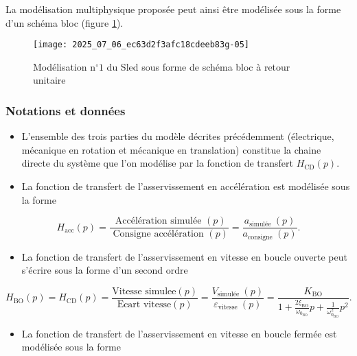 
La modélisation multiphysique proposée peut ainsi être modélisée sous la forme d'un schéma bloc (figure \ref{ccs_mp_2022_fig_07}).

\begin{figure}[!h]
\centering
\texttt{[image: 2025\_07\_06\_ec63d2f3afc18cdeeb83g-05]}
\caption{\label{ccs_mp_2022_fig_07}Modélisation $\mathrm{n}^{\circ} 1$ du Sled sous forme de schéma bloc à retour unitaire}
\end{figure}


\subsubsection*{Notations et données}
\begin{itemize}
  \item L'ensemble des trois parties du modèle décrites précédemment (électrique, mécanique en rotation et mécanique en translation) constitue la chaine directe du système que l'on modélise par la fonction de transfert $H_{\mathrm{CD}}(p)$.
  \item La fonction de transfert de l'asservissement en accélération est modélisée sous la forme
\end{itemize}

$$
H_{\mathrm{acc}}(p)=\frac{\text { Accélération simulée }(p)}{\text { Consigne accélération }(p)}=\frac{a_{\text {simulée }}(p)}{a_{\text {consigne }}(p)} .
$$

\begin{itemize}
  \item La fonction de transfert de l'asservissement en vitesse en boucle ouverte peut s'écrire sous la forme d'un second ordre
\end{itemize}

$$
H_{\mathrm{BO}}(p)=H_{\mathrm{CD}}(p)=\frac{\text{Vitesse simulee}(p)}{\text{Ecart vitesse}(p)}=\frac{V_{\text {simulée }}(p)}{\varepsilon_{\text {vitesse }}(p)}=\frac{K_{\mathrm{BO}}}{1+\frac{2 \xi_{\mathrm{BO}}}{\omega_{0_{\mathrm{BO}}}} p+\frac{1}{\omega_{0_{\mathrm{BO}}}^{2}} p^{2}} .
$$

\begin{itemize}
  \item La fonction de transfert de l'asservissement en vitesse en boucle fermée est modélisée sous la forme
\end{itemize}

